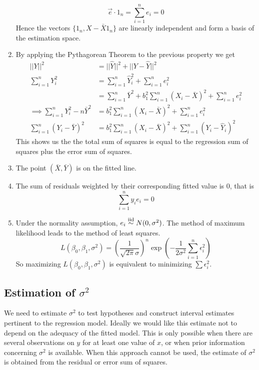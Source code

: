 \begin{enumerate}[label=(\roman*)]
    \[\vec{e} \cdot 1_n = \sum_{i=1}^n e_i = 0\]
    Hence the vectors $\{1_n, X - \bar{X}1_n\}$ are linearly independent and form a basis of the estimation space. 
    \item By applying the Pythagorean Theorem to the previous property we get 
    \begin{align*}
        ||Y||^2 &= ||\hat{Y}||^2 + ||Y-\hat{Y}||^2\\
        \sum_{i=1}^n Y_i^2 &= \sum_{i=1}^n \hat{Y}_i^2 + \sum_{i=1}^n e_i^2\\
        &= \sum_{i=1}^n \bar{Y}^2 + b_1^2\sum_{i=1}^n (X_i - \bar{X})^2 + \sum_{i=1}^n e_i^2\\
        \implies \sum_{i=1}^n Y_i^2 - n\bar{Y}^2 &= b_1^2\sum_{i=1}^n (X_i -\bar{X})^2 + \sum_{i=1}^n e_i^2\\
        \sum_{i=1}^n (Y_i - \bar{Y})^2 &= b_1^2\sum_{i=1}^n (X_i - \bar{X})^2 + \sum_{i=1}^n \left(Y_i - \hat{Y}_i\right)^2     
    \end{align*}
    This shows us the the total sum of squares is equal to the regression sum of squares plus the error sum of squares. 
    \item The point $(\bar{X}, \bar{Y})$ is on the fitted line. 
    \item The sum of residuals weighted by their corresponding fitted value is 0, that is 
    \[\sum_{i=1}^n y_ie_i = 0\]
    \item Under the normality assumption, $e_i \overset{\mathrm{iid}}{\sim} N(0,\sigma^2)$. The method of maximum likelihood leads to the method of least squares.
    \[L(\beta_0, \beta_1,\sigma^2) = \left(\frac{1}{\sqrt{2\pi}\sigma}\right)^n\exp\left(-\frac{1}{2\sigma^2}\sum_{i=1}^n \epsilon_i^2\right)\]
    So maximizing $L(\beta_0,\beta_1, \sigma^2)$ is equivalent to minimizing $\sum \epsilon_i^2$.
\end{enumerate}

 \subsection{Estimation of $\sigma^2$}

 We need to estimate $\sigma^2$ to test hypotheses and construct interval estimates pertinent to the regression model. Ideally we would like this estimate not to depend on the adequacy of the fitted model. This is only possible when there are several observations on $y$ for at least one value of $x$, or when prior information concerning $\sigma^2$ is available. When this approach cannot be used, the estimate of $\sigma^2$ is obtained from the residual or error sum of squares.

